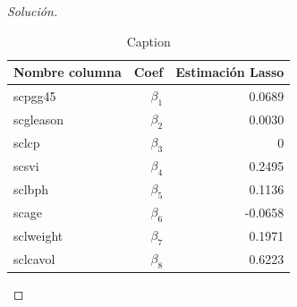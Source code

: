 \documentclass[10.5pt,notitlepage]{article}
\newenvironment{solucion}
  {\begin{proof}[Solución]}
  {\end{proof}}
\theoremstyle{plain}
\begin{document}
\begin{solucion}
\begin{table}[htb]
    \centering
        \centering
        \begin{tabular}{@{}l@{\hskip 0.3in}r@{\hskip 0.3in}r@{}}
        \toprule
Nombre columna& Coef & Estimación Lasso\\        
\midrule        
scpgg45    &\(\beta_1\)& 0.0689\\
scgleason  &\(\beta_2\)& 0.0030\\
sclcp      &\(\beta_3\)&0      \\ 
scsvi      &\(\beta_4\)& 0.2495\\
sclbph     &\(\beta_5\)& 0.1136\\
scage      &\(\beta_6\)&-0.0658\\
sclweight  &\(\beta_7\)& 0.1971\\
sclcavol   &\(\beta_8\)& 0.6223\\
        \end{tabular}
    \caption{Caption}
    \label{tab:2}
\end{table}

\end{solucion}
\end{document}
